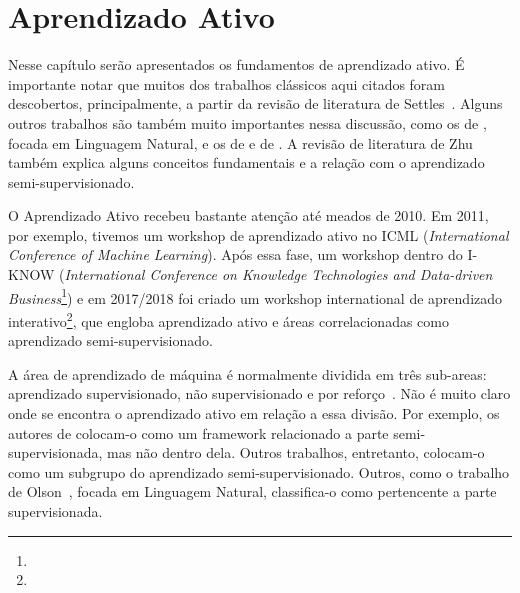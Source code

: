 \chapter{Aprendizado Ativo}
\label{cap:aprendizado_ativo}

Nesse capítulo serão apresentados os fundamentos de aprendizado ativo. É importante notar que muitos dos trabalhos clássicos aqui citados foram descobertos, principalmente, a partir da revisão de literatura de Settles~\citep{settles2012active,settles2014active}. Alguns outros trabalhos são também muito importantes nessa discussão, como os de \cite{olsson2009literature}, focada em Linguagem Natural, e os de \cite{aggarwal2014active} e de \cite{wang2011active}. A revisão de literatura de Zhu~\citep{zhu2006semi} também explica alguns conceitos fundamentais e a relação com o aprendizado semi-supervisionado.

O Aprendizado Ativo recebeu bastante atenção até meados de 2010. Em 2011, por exemplo, tivemos um workshop de aprendizado ativo no ICML (\emph{International Conference of Machine Learning}). Após essa fase,  um workshop dentro do I-KNOW (\emph{International Conference on Knowledge Technologies and Data-driven Business}\footnote{\TODO{\url{}}}) e em 2017/2018 foi criado um workshop international de aprendizado interativo\footnote{\TODO{\url{}}}, que engloba aprendizado ativo e áreas correlacionadas como aprendizado semi-supervisionado. 

A área de aprendizado de máquina é normalmente dividida em três sub-areas: aprendizado supervisionado, não supervisionado e por reforço~\citep{abu2012learning}. Não é muito claro onde se encontra o aprendizado ativo em relação a essa divisão. Por exemplo, os autores de \cite{settles2012active, zhu2006semi} colocam-o como um framework relacionado a parte semi-supervisionada, mas não dentro dela. Outros trabalhos, entretanto, colocam-o como um subgrupo do aprendizado semi-supervisionado. Outros, como o trabalho de Olson~\citep{olsson2009literature}, focada em Linguagem Natural, classifica-o como pertencente a parte supervisionada. 




